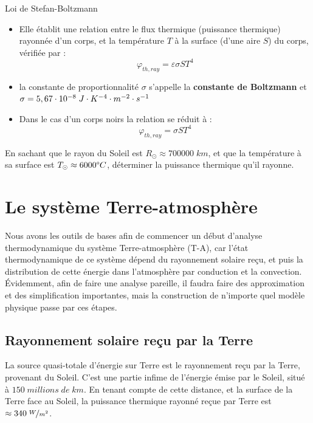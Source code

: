 \documentclass[11pt,a4paper]{article}
\begin{document}
\begin{defn}{Loi de Stefan-Boltzmann}
\begin{itemize}
    \item Elle établit une relation entre le flux thermique (puissance thermique) rayonnée d'un corps, et la température $T$ à la surface (d'une aire $S$) du corps, vérifiée par : 
    \[ \varphi_{th,ray} = \varepsilon\sigma S T^4 \]
    \item la constante de proportionnalité $\sigma$ s'appelle la \textbf{constante de Boltzmann} et $\sigma = 5,67\cdot10^{-8}\; J\cdot K^{-4}\cdot m^{-2}\cdot s^{-1}$
    \item Dans le cas d'un corps noirs la relation se réduit à : \[\varphi_{th,ray} = \sigma S T^4 \]
\end{itemize}
\end{defn}

\begin{exo} 
En sachant que le rayon du Soleil est $R_\odot\approx700000\; km$, et que la température à sa surface est $T_\odot\approx6000\degree C$, déterminer la puissance thermique qu'il rayonne. 

\vspace{6cm}
\end{exo}
\newpage

\section{Le système Terre-atmosphère}

Nous avons les outils de bases afin de commencer un début d'analyse thermodynamique du système Terre-atmosphère (T-A), car l'état thermodynamique de ce système dépend du rayonnement solaire reçu, et puis la distribution de cette énergie dans l'atmosphère par conduction et la convection. Évidemment, afin de faire une analyse pareille, il faudra faire des approximation et des simplification importantes, mais la construction de n'importe quel modèle physique passe par ces étapes. 

\subsection{Rayonnement solaire reçu par la Terre}

La source quasi-totale d'énergie sur Terre est le rayonnement reçu par la Terre, provenant du Soleil. C'est une partie infime de l'énergie émise par le Soleil, situé à $150\; millions\; de\; km$. En tenant compte de cette distance, et la surface de la Terre face au Soleil, la puissance thermique rayonné reçue par Terre est $\approx 340\; \nicefrac{W}{m^2}$.
\end{document}

